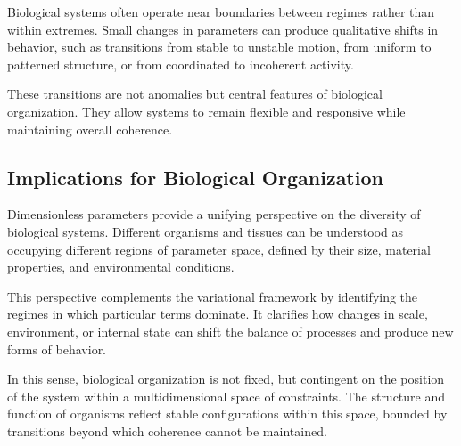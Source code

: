 \documentclass[11pt,oneside]{book}
\begin{document}
Biological systems often operate near boundaries between regimes rather than within extremes. Small changes in parameters can produce qualitative shifts in behavior, such as transitions from stable to unstable motion, from uniform to patterned structure, or from coordinated to incoherent activity.

These transitions are not anomalies but central features of biological organization. They allow systems to remain flexible and responsive while maintaining overall coherence.

\subsection{Implications for Biological Organization}

Dimensionless parameters provide a unifying perspective on the diversity of biological systems. Different organisms and tissues can be understood as occupying different regions of parameter space, defined by their size, material properties, and environmental conditions.

This perspective complements the variational framework by identifying the regimes in which particular terms dominate. It clarifies how changes in scale, environment, or internal state can shift the balance of processes and produce new forms of behavior.

In this sense, biological organization is not fixed, but contingent on the position of the system within a multidimensional space of constraints. The structure and function of organisms reflect stable configurations within this space, bounded by transitions beyond which coherence cannot be maintained.

\newpage

\backmatter
\end{document}

